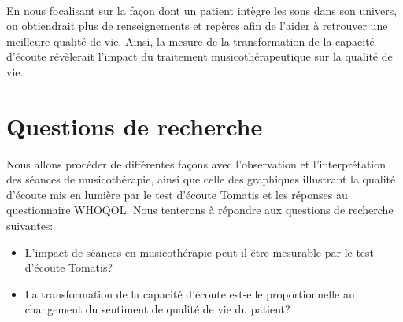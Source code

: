   \\
  En nous focalisant sur la façon dont un patient intègre les sons dans son univers, %
   on obtiendrait plus de renseignements et repères afin de l'aider à 
  retrouver  une 
  meilleure qualité de vie.
Ainsi, la  mesure de la  
transformation de la capacité d'écoute révèlerait l'impact  du traitement 
musicothérapeutique sur la qualité de vie.

\section*{Questions de recherche}

Nous allons procéder de différentes façons avec l'observation et l'interprétation  des séances de 
musicothérapie, ainsi que celle des graphiques illustrant la qualité d'écoute mis en lumière par le test 
d'écoute Tomatis\textsuperscript \textregistered 
et les réponses au 
questionnaire WHOQOL. 
Nous tenterons à 
répondre aux questions de recherche suivantes: 

\begin{itemize}
	\item L'impact de séances en musicothérapie  peut-il être mesurable par le test 
	d'écoute Tomatis\textsuperscript \textregistered?
	\item La transformation de la capacité d'écoute est-elle  proportionnelle au changement 
	du sentiment de qualité de vie du patient?
\end{itemize}

